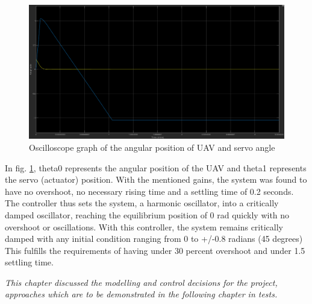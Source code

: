 \begin{figure}[H]
    \centering
    \includegraphics[scale=0.3]{graphics/Control/TSP2D6.png}
    \caption{Oscilloscope graph of the angular position of UAV and servo angle}
     \label{fig:Oscilloscope graph of the angular position of UAV and servo angle}
\end{figure} 

In fig. \ref{fig:Oscilloscope graph of the angular position of UAV and servo angle}, theta0 represents the angular position of the UAV and theta1 represents the servo (actuator) position. With the mentioned gains, the system was found to have no overshoot, no necessary rising time and a settling time of 0.2 seconds. The controller thus sets the system, a harmonic oscillator, into a critically damped oscillator, reaching the equilibrium position of 0 rad quickly with no overshoot or oscillations. With this controller, the system remains critically damped with any initial condition ranging from 0 to +/-0.8 radians (45 degrees)
This fulfills the requirements of having under 30 percent overshoot and under 1.5 settling time. 



\textit{This chapter discussed the modelling and control decisions for the project, approaches which are to be demonstrated in the following chapter in tests. }

